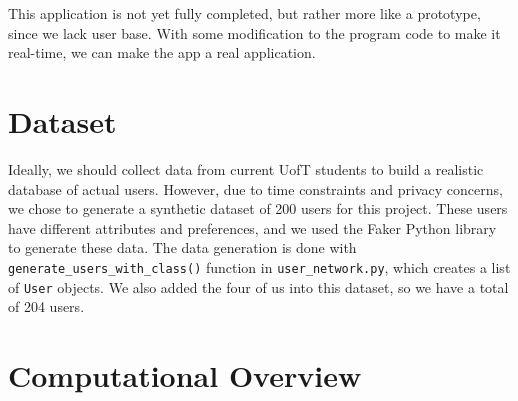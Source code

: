 \documentclass[fontsize=11pt]{article}
\begin{document}
This application is not yet fully completed, but rather more like a prototype, since we lack user base. 
With some modification to the program code to make it real-time, we can make the app a real application. 

\section*{Dataset}
Ideally, we should collect data from current UofT students to build a realistic database of actual users.
However, due to time constraints and privacy concerns, we chose to generate a synthetic dataset of 200 users for this project.
These users have different attributes and preferences, and we used the Faker Python library to generate these data.
The data generation is done with \texttt{generate\_users\_with\_class()} function in \texttt{user\_network.py}, which creates a list of \texttt{User} objects.
We also added the four of us into this dataset, so we have a total of 204 users.

\section*{Computational Overview}


\\
\\
\end{document}
